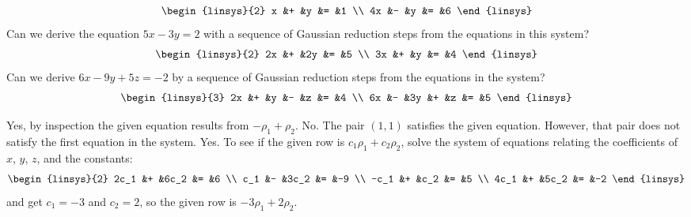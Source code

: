 \begin{exercises}
\begin{exparts}
\begin{equation*}
\begin{linsys}{2}
             x  &+  &y  &=  &1  \\
            4x  &-  &y  &=  &6
          \end{linsys}
        \end{equation*}
      \partsitem Can we derive the equation \( 5x-3y=2 \) with a sequence of
        Gaussian reduction steps from the equations in this system?
        \begin{equation*}
          \begin{linsys}{2}
            2x  &+  &2y &=  &5  \\
            3x  &+  &y  &=  &4
          \end{linsys}
        \end{equation*}
      \partsitem Can we derive \( 6x-9y+5z=-2 \)  
        by a sequence of
        Gaussian reduction steps from the equations in the system?
        \begin{equation*}
          \begin{linsys}{3}
            2x  &+  &y  &-  &z  &=  &4  \\
            6x  &-  &3y &+  &z  &=  &5
          \end{linsys}
        \end{equation*}
    \end{exparts}
    \begin{answer} 
       \begin{exparts} 
        \partsitem Yes, by inspection the given equation results from
          \( -\rho_1+\rho_2 \).
        \partsitem No.
          The pair \( (1,1) \) satisfies the given equation. 
          However, that pair 
          does not satisfy the first equation in the system.
        \partsitem Yes.
          To see if the given row is \( c_1\rho_1+c_2\rho_2 \), solve
          the system of equations relating the coefficients of $x$, $y$,
          $z$, and the constants:
          \begin{equation*}
            \begin{linsys}{2}
               2c_1  &+  &6c_2  &=  &6  \\
                c_1  &-  &3c_2  &=  &-9 \\
               -c_1  &+  &c_2   &=  &5  \\
               4c_1  &+  &5c_2  &=  &-2 
            \end{linsys}
          \end{equation*}
          and get $c_1=-3$ and $c_2=2$, so the given row is
          \( -3\rho_1+2\rho_2 \).
      \end{exparts}  

\end{answer}
\end{exercises}
